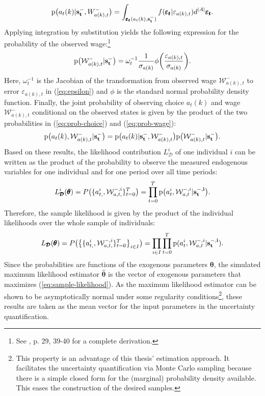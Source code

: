 \noindent
\begin{align} \label{eq:prob-choice}
\text{p}\big(a_t(k) | \bold{s_t^-},W^{-}_{a(k),t}\big) = \int_{\pmb{\varepsilon_t}(a_t(k),\bold{s_t^-})} f(\pmb{\varepsilon_t}|\varepsilon_{a(k),t}) d^{|A|} \pmb{\varepsilon_t}.
\end{align}
Applying integration by substitution yields the following expression for the probability of the observed wage:\footnote{See \cite{Raabe.2019}, p. 29, 39-40 for a complete derivation.}
\begin{align} \label{eq:prob-wage}
\text{p}\big(\mathcal{W}^{-}_{a(k),t} | \bold{s_t^-}\big) = \omega_t^{-1} \frac{1}{\sigma_{a(k)}} \phi\bigg(\frac{\varepsilon_{a(k),t}}{\sigma_{a(k)}}\bigg).
\end{align}
Here, $\omega_t^{-1}$ is the Jacobian of the transformation from observed wage $\mathcal{W}^{-}_{a(k),t}$ to error $\varepsilon_{a(k),t}$ in (\ref{eq:epsilon}) and $\phi$ is the standard normal probability density function.
Finally, the joint probability of observing choice $a_t(k)$ and wage $\mathcal{W}^{-}_{a(k),t}$ conditional on the observed states is given by the product of the two probabilities in (\ref{eq:prob-choice}) and (\ref{eq:prob-wage}):
\begin{align}
\text{p}\big(a_t(k),\mathcal{W}^{-}_{a(k),t}|\bold{s_t^-}\big) = \text{p}\big(a_t(k)|\bold{s_t^-}, \mathcal{W}^{-}_{a(k),t}\big)\text{p}\big(\mathcal{W}^{-}_{a(k),t}|\bold{s_t^-}\big).
\end{align}
Based on these results, the likelihood contribution $L^{i}_{\pmb{\mathcal{D}}}$ of one individual $i$ can be written as the product of the probability to observe the measured endogenous variables for one individual and for one period over all time periods:
\begin{align}
L^{i}_{\pmb{\mathcal{D}}}(\pmb{\theta}) = P\big(\{a_{t,}^{i},\mathcal{W}^{-,i}_{a,t,}\}_{t=0}^T\big) = \prod_{t=0}^{T} \text{p}\big(a_t^{i},\mathcal{W}_{a,t}^{-,i}|\bold{s_t^{-,i}}\big).
\end{align}
Therefore, the sample likelihood is given by the product of the individual likelihoods over the whole sample of individuals:
\begin{align} \label{eq:sample-likelihood}
L_{\pmb{\mathcal{D}}}(\pmb{\theta}) = P\big(\big\{\{a_{t,}^{i},\mathcal{W}^{-,i}_{a,t,}\}_{t=0}^T\big\}_{i \in I}\big) = \prod_{i \in I}\prod_{t=0}^{T} \text{p}(a_t^{i},\mathcal{W}_{a,t}^{-,i}|\bold{s_t^{-,i})}.
\end{align}
Since the probabilities are functions of the exogenous parameters $\pmb{\theta}$, the simulated maximum likelihood estimator $\pmb{\hat{\theta}}$ is the vector of exogenous parameters that maximizes (\ref{eq:sample-likelihood}). As the maximum likelihood estimator can be shown to be asymptotically normal under some regularity conditions\footnote{This property is an advantage of this thesis' estimation approach. It facilitates the uncertainty quantification via Monte Carlo sampling because there is a simple closed form for the (marginal) probability density available. This eases the construction of the desired samples.}, these results are taken as the mean vector for the input parameters in the uncertainty quantification.

